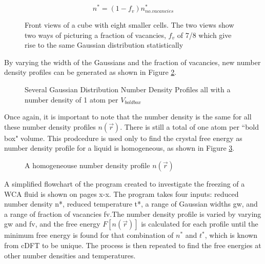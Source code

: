 \documentclass[double,12pt]{beavtex}
\begin{document}
\begin{displaymath}{ n^* = (1-f_v){n_{no.vacancies}^*}}\end{displaymath} 

\begin{figure}[h!]
    \centering
    \caption{Front views of a cube with eight smaller cells. The two views show two ways of picturing a fraction of vacancies, $f_v$ of 7/8 which give rise to the same Gaussian distribution statistically}
    \label{fig:SameStatPic}
  \end{figure} 

By varying the width of the Gaussians and the fraction of vacancies, new number density profiles can be generated as shown in Figure \ref{fig:Ensemble_vary}.

\begin{figure}[h!]
    \centering
    \caption{Several Gaussian Distribution Number Density Profiles all with a number density of 1 atom per $V_{bold box}$}
    \label{fig:Ensemble_vary}
  \end{figure}  

Once again, it is important to note that the number density is the same for all these number density profiles $n(\vec{r})$. There is still a total of one atom per ``bold box" volume. This prodcedure is used only to find the crystal free energy as number density profile for a liquid is homogeneous, as shown in Figure \ref{fig:homogen_denisty}.  

 \begin{figure}[h!]
    \centering
    \caption{A homogeneouse number density profile $n(\vec{r})$}
    \label{fig:homogen_denisty}
  \end{figure}    
 
A simplified flowchart of the program created to investigate the freezing of a WCA fluid is shown on pages x-x. The program takes four inputs: reduced number density n*, reduced temperature t*, a range of Gaussian widths gw, and a range of fraction of vacancies fv.The number density profile is varied by varying gw and fv, and the free energy $F[n(\vec{r})]$ is calculated for each profile until the minimum free energy is found for that combination of $n^*$ and $t^*$, which is known from cDFT to be unique. The process is then repeated to find the free energies at other number densities and temperatures. 
\end{document}
